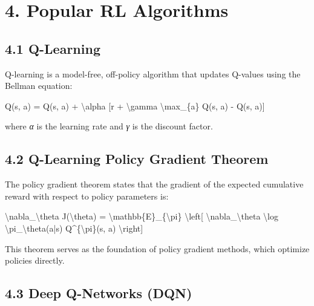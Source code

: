 \documentclass[
]{book}
\newenvironment{Shaded}{\begin{snugshade}}{\end{snugshade}}
\newcommand{\NormalTok}[1]{#1}
\begin{document}
\section{\texorpdfstring{\textbf{4. Popular RL Algorithms}}{4. Popular RL Algorithms}}\label{popular-rl-algorithms}

\subsection{\texorpdfstring{\textbf{4.1 Q-Learning}}{4.1 Q-Learning}}\label{q-learning}

Q-learning is a model-free, off-policy algorithm that updates Q-values using the Bellman equation:

\begin{Shaded}
\begin{Highlighting}[]
\NormalTok{Q(s, a) = Q(s, a) + \textbackslash{}alpha [r + \textbackslash{}gamma \textbackslash{}max\_\{a\textquotesingle{}\} Q(s\textquotesingle{}, a\textquotesingle{}) {-} Q(s, a)]}
\end{Highlighting}
\end{Shaded}

where \emph{α} is the learning rate and \emph{γ} is the discount factor.

\subsection{\texorpdfstring{\textbf{4.2 Q-Learning Policy Gradient Theorem}}{4.2 Q-Learning Policy Gradient Theorem}}\label{q-learning-policy-gradient-theorem}

The policy gradient theorem states that the gradient of the expected cumulative reward with respect to policy parameters is:

\begin{Shaded}
\begin{Highlighting}[]
\NormalTok{\textbackslash{}nabla\_\textbackslash{}theta J(\textbackslash{}theta) = \textbackslash{}mathbb\{E\}\_\{\textbackslash{}pi\} \textbackslash{}left[ \textbackslash{}nabla\_\textbackslash{}theta \textbackslash{}log \textbackslash{}pi\_\textbackslash{}theta(a|s) Q\^{}\{\textbackslash{}pi\}(s, a) \textbackslash{}right]}
\end{Highlighting}
\end{Shaded}

This theorem serves as the foundation of policy gradient methods, which optimize policies directly.

\subsection{\texorpdfstring{\textbf{4.3 Deep Q-Networks (DQN)}}{4.3 Deep Q-Networks (DQN)}}\label{deep-q-networks-dqn}
\end{document}
